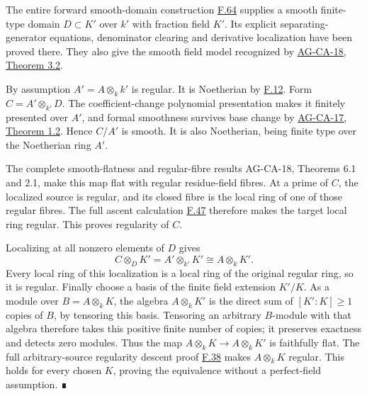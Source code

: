 \documentclass[11pt,a4paper,openany]{report}
\begin{document}
The entire forward smooth-domain construction \hyperref[AG-RG-S05-algebra-lemma-localization-smooth-separable]{F.64} supplies a smooth finite-type domain \(D\subset K'\) over \(k'\) with fraction field \(K'\). Its explicit separating-generator equations, denominator clearing and derivative localization have been proved there. They also give the smooth field model recognized by \href{https://github.com/KokunoYumeto/open-math-courses/blob/d02d0a3669f42579db037cd44de1d113fdd770a1/docs/courses/AG-CA/src/smooth-algebras-over-a-field-and-the-jacobian-criterion.md}{AG-CA-18, Theorem 3.2}.

By assumption \(A'=A\otimes_kk'\) is regular. It is Noetherian by \hyperref[AG-RG-S05-algebra-lemma-Noetherian-field-extension]{F.12}. Form \(C=A'\otimes_{k'}D\). The coefficient-change polynomial presentation makes it finitely presented over \(A'\), and formal smoothness survives base change by \href{https://github.com/KokunoYumeto/open-math-courses/blob/d02d0a3669f42579db037cd44de1d113fdd770a1/docs/courses/AG-CA/src/formally-smooth-unramified-and-etale-ring-maps.md}{AG-CA-17, Theorem 1.2}. Hence \(C/A'\) is smooth. It is also Noetherian, being finite type over the Noetherian ring \(A'\).

The complete smooth-flatness and regular-fibre results AG-CA-18, Theorems 6.1 and 2.1, make this map flat with regular residue-field fibres. At a prime of \(C\), the localized source is regular, and its closed fibre is the local ring of one of those regular fibres. The full ascent calculation \hyperref[AG-RG-S05-algebra-lemma-flat-over-regular-with-regular-fibre]{F.47} therefore makes the target local ring regular. This proves regularity of \(C\).

Localizing at all nonzero elements of \(D\) gives \[C\otimes_DK'=A'\otimes_{k'}K'\cong A\otimes_kK'.\] Every local ring of this localization is a local ring of the original regular ring, so it is regular. Finally choose a basis of the finite field extension \(K'/K\). As a module over \(B=A\otimes_kK\), the algebra \(A\otimes_kK'\) is the direct sum of \([K':K]\geq1\) copies of \(B\), by tensoring this basis. Tensoring an arbitrary \(B\)-module with that algebra therefore takes this positive finite number of copies; it preserves exactness and detects zero modules. Thus the map \(A\otimes_kK\to A\otimes_kK'\) is faithfully flat. The full arbitrary-source regularity descent proof \hyperref[AG-RG-S05-algebra-lemma-descent-regular]{F.38} makes \(A\otimes_kK\) regular. This holds for every chosen \(K\), proving the equivalence without a perfect-field assumption. ∎
\end{document}
